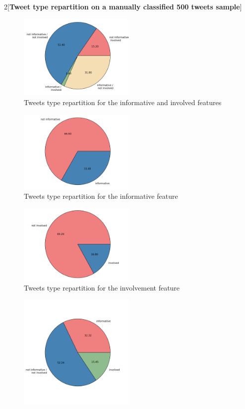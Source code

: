 \documentclass[a4paper,twoside,12pt,openright]{report}
\begin{document}
\begin{multicols}{2}[\textbf{Tweet type repartition on a manually classified 500 tweets sample}]

\begin{figure}[H]
\centering
\includegraphics[width=0.5\textwidth]{images/plots/pies/pie_pairs.png}
\caption{Tweets type repartition for the informative and involved features}
\label{pieTypeInfInv}
\end{figure}
\begin{figure}[H]
\centering
\includegraphics[width=0.5\textwidth]{images/plots/pies/pie_info.png}
\caption{Tweets type repartition for the informative feature}
\label{pieTypeInf}
\end{figure}
\begin{figure}[H]
\centering
\includegraphics[width=0.5\textwidth]{images/plots/pies/pie_invo.png}
\caption{Tweets type repartition for the involvement feature}
\label{pieTypeInv}
\end{figure}
\vspace*{-1cm}
\begin{figure}[H]
\centering
\includegraphics[width=0.5\textwidth]{images/plots/pies/pie_pairs3.png}

\end{figure}
\end{multicols}
\end{document}
